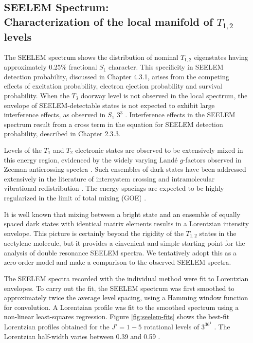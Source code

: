 \documentclass[12pt]{mitthesis}
\begin{document}
\subsection{SEELEM Spectrum: \\Characterization of the local manifold of
  $T_{1,2}$ levels}

The SEELEM spectrum shows the distribution of nominal $T_{1,2}$
eigenstates having approximately 0.25\% fractional $S_1$ character.
This specificity in SEELEM detection probability, discussed in Chapter
4.3.1, arises from the competing effects of excitation probability,
electron ejection probability and survival probability.  When the
$T_3$ doorway level is not observed in the local spectrum, the
envelope of SEELEM-detectable states is not expected to exhibit large
interference effects, as observed in $S_1$ $3^3$ .  Interference
effects in the SEELEM spectrum result from a cross term in the
equation for SEELEM detection probability, described in Chapter 2.3.3.

Levels of the $T_1$ and $T_2$ electronic states are observed to be
extensively mixed in this energy region, evidenced by the widely
varying Land\'{e} $g$-factors observed in Zeeman anticrossing spectra
\cite{dupre95a}.  Such ensembles of dark states have been addressed
extensively in the literature of intersystem crossing and
intramolecular vibrational redistribution .  The energy
spacings are expected to be highly regularized in the limit of total
mixing (GOE) .

It is well known that mixing between a bright state and an ensemble of
equally spaced dark states with identical matrix elements results in a
Lorentzian intensity envelope.  This picture is certainly beyond the
rigidity of the $T_{1,2}$ states in the acetylene molecule, but it
provides a cinvenient and simple starting point for the analysis of
double resonance SEELEM spectra.  We tentatively adopt this as a
zero-order model and make a comparison to the observed SEELEM spectra.

The SEELEM spectra recorded with the individual method were fit to
Lorentzian envelopes.  To carry out the fit, the SEELEM spectrum was
first smoothed to approximately twice the average level spacing, using
a Hamming window function for convolution.  A Lorentzian profile was
fit to the smoothed spectrum using a non-linear least-squares
regression.  Figure \ref{fig:seelem-fits} shows the best-fit
Lorentzian profiles obtained for the $J'=1-5$ rotational levels of
$3^36^1$ .  The Lorentzian half-width varies between 0.39 and
0.59 \rcm.
\end{document}
